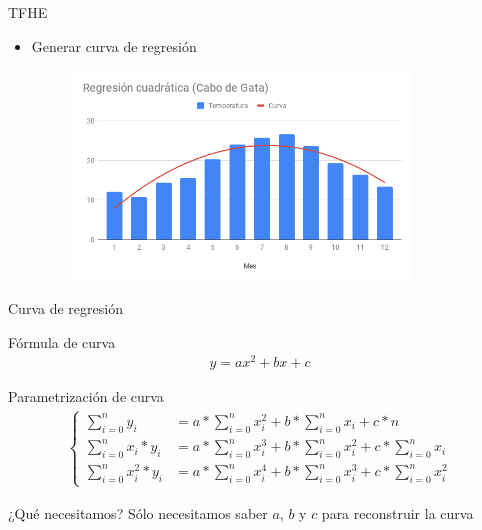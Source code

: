 \documentclass{beamer}
\begin{document}
\begin{frame}{TFHE}
    \begin{itemize}
        \item Generar curva de regresión
        
        \begin{figure}[H]
            \centering\includegraphics[width=0.85\textwidth]{reg2_cg}
        \end{figure}
    \end{itemize}
\end{frame}

\begin{frame}{Curva de regresión}

    \begin{block}{Fórmula de curva}
        \vspace*{-\baselineskip}\setlength\belowdisplayshortskip{0pt}
        \begin{align*}
        y = ax^2 + bx + c
        \end{align*}
    \end{block}
    
    \begin{block}{Parametrización de curva}
        \vspace*{-\baselineskip}\setlength\belowdisplayshortskip{0pt}
        \begin{align*}
            \begin{cases}
                \sum_{i=0}^n y_i         &= a*\sum_{i=0}^n x_i^2 + b*\sum_{i=0}^n x_i   + c*n \\
                \sum_{i=0}^n x_i * y_i   &= a*\sum_{i=0}^n x_i^3 + b*\sum_{i=0}^n x_i^2 + c*\sum_{i=0}^n x_i \\
                \sum_{i=0}^n x_i^2 * y_i &= a*\sum_{i=0}^n x_i^4 + b*\sum_{i=0}^n x_i^3 + c*\sum_{i=0}^n x_i^2
            \end{cases}
        \end{align*}
    \end{block}
    \begin{alertblock}{¿Qué necesitamos?}
    Sólo necesitamos saber $a$, $b$ y $c$ para reconstruir la curva
    \end{alertblock}
\end{frame}
\end{document}

